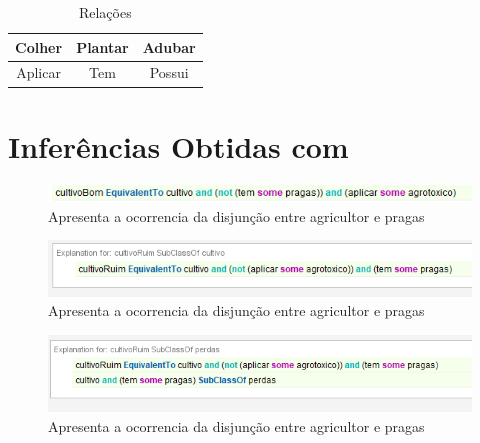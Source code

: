 \documentclass{article}
\begin{document}
    \begin{table}[!ht]
        \centering
        \begin{tabular}{c|c|c}
            Colher&Plantar&Adubar\\
            \hline
            Aplicar&Tem&Possui\\
        \end{tabular}
        \caption{Relações}
        \label{tab:my_label}
    \end{table}
    
    
    \section{Inferências Obtidas com }
   
        \begin{figure}[!ht]
            \centering %
            \includegraphics[width=1\textwidth]{imagens/inferencia/inf_01.PNG} %
            \caption{Apresenta a ocorrencia da disjunção entre agricultor e pragas}
            \label{figura:disjunt}
        \end{figure}
        \begin{figure}[!htp]
            \centering %
            \includegraphics[width=1\textwidth]{imagens/inferencia/inf_02.PNG} %
            \caption{Apresenta a ocorrencia da disjunção entre agricultor e pragas}
            \label{figura:disjunt}
        \end{figure}
        \begin{figure}[!htp]
            \centering %
            \includegraphics[width=1\textwidth]{imagens/inferencia/inf_03.PNG} %
            \caption{Apresenta a ocorrencia da disjunção entre agricultor e pragas}
            \label{figura:disjunt}
        \end{figure}
\end{document}
